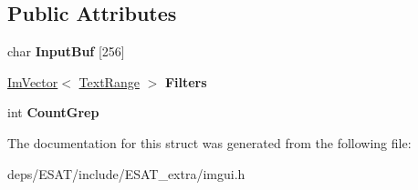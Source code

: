 \subsection*{Public Attributes}
\begin{DoxyCompactItemize}
\item 
\mbox{\label{struct_im_gui_text_filter_ad070acb1038199dd4e8f5d010c5cb5ba}} 
char {\bfseries Input\+Buf} \mbox{[}256\mbox{]}
\item 
\mbox{\label{struct_im_gui_text_filter_a5a930a339a9384e6bfadfa56a7c111fd}} 
\mbox{\hyperlink{class_im_vector}{Im\+Vector}}$<$ \mbox{\hyperlink{struct_im_gui_text_filter_1_1_text_range}{Text\+Range}} $>$ {\bfseries Filters}
\item 
\mbox{\label{struct_im_gui_text_filter_ac31839c319fe4211c21fc143b7249f86}} 
int {\bfseries Count\+Grep}
\end{DoxyCompactItemize}


The documentation for this struct was generated from the following file\+:\begin{DoxyCompactItemize}
\item 
deps/\+E\+S\+A\+T/include/\+E\+S\+A\+T\+\_\+extra/imgui.\+h\end{DoxyCompactItemize}
